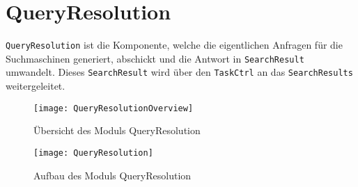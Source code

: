
\section{QueryResolution}

\lstinline|QueryResolution| ist die Komponente, welche die eigentlichen Anfragen für die Suchmaschinen generiert, abschickt und die Antwort in \lstinline|SearchResult| umwandelt. Dieses \lstinline|SearchResult| wird über den \lstinline|TaskCtrl| an das \lstinline|SearchResults| weitergeleitet.

\begin{figure}[htb]
    \centering
  	\texttt{[image: QueryResolutionOverview]}
  	\caption{Übersicht des Moduls QueryResolution}
\end{figure}

\begin{figure}[htb]
    	\centering
  	\texttt{[image: QueryResolution]}
  	\caption{Aufbau des Moduls QueryResolution}
\end{figure}

%


\pagebreak
\clearpage

